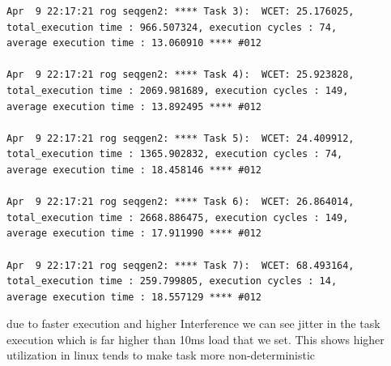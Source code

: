 \documentclass[a4paper,11pt]{article}%
\newenvironment{qanda}{\setlength{\parindent}{0pt}}{\bigskip}
\begin{document}
\begin{qanda}
\begin{enumerate}
\begin{lstlisting}
Apr  9 22:17:21 rog seqgen2: **** Task 3):  WCET: 25.176025, 
total_execution time : 966.507324, execution cycles : 74, 
average execution time : 13.060910 **** #012 

Apr  9 22:17:21 rog seqgen2: **** Task 4):  WCET: 25.923828, 
total_execution time : 2069.981689, execution cycles : 149,
average execution time : 13.892495 **** #012 

Apr  9 22:17:21 rog seqgen2: **** Task 5):  WCET: 24.409912, 
total_execution time : 1365.902832, execution cycles : 74, 
average execution time : 18.458146 **** #012 

Apr  9 22:17:21 rog seqgen2: **** Task 6):  WCET: 26.864014, 
total_execution time : 2668.886475, execution cycles : 149, 
average execution time : 17.911990 **** #012 

Apr  9 22:17:21 rog seqgen2: **** Task 7):  WCET: 68.493164, 
total_execution time : 259.799805, execution cycles : 14, 
average execution time : 18.557129 **** #012 
\end{lstlisting}


			due to faster execution and higher Interference we can see jitter in the task execution which is far higher than 10ms load that we set. This shows higher utilization in linux tends to make task more non-deterministic


\end{enumerate}
\end{qanda}
\end{document}
